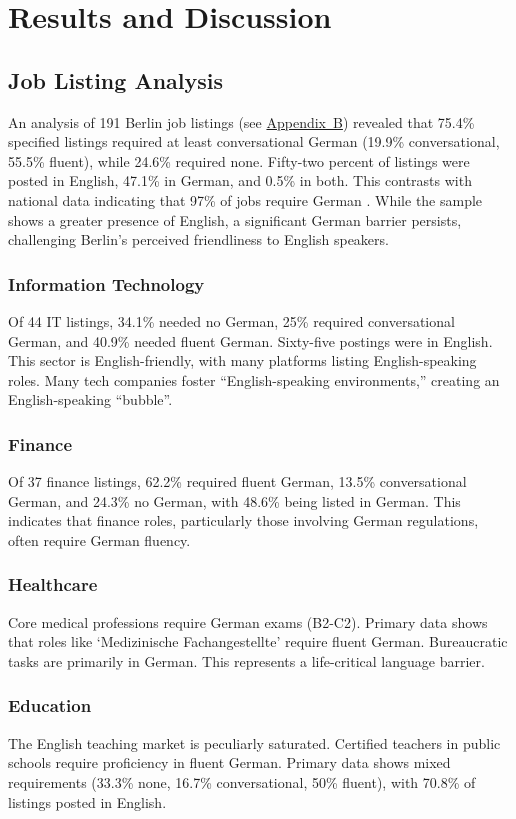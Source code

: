 \chapter{Results and Discussion}
\vspace{5pt}
\section{Job Listing Analysis}
An analysis of 191 Berlin job listings (see \hyperref[appendix:B]{Appendix~B}) revealed that 75.4\% specified listings required at least conversational German (19.9\% conversational, 55.5\% fluent), while 24.6\% required none. Fifty-two percent of listings were posted in English, 47.1\% in German, and 0.5\% in both. This contrasts with national data indicating that 97\% of jobs require German \citep{Jones25}. While the sample shows a greater presence of English, a significant German barrier persists, challenging Berlin’s perceived friendliness to English speakers.

\subsection{Information Technology}
Of 44 IT listings, 34.1\% needed no German, 25\% required conversational German, and 40.9\% needed fluent German. Sixty-five postings were in English. This sector is English-friendly, with many platforms listing English-speaking roles. Many tech companies foster “English-speaking environments,” creating an English-speaking “bubble”.   

\subsection{Finance}
Of 37 finance listings, 62.2\% required fluent German, 13.5\% conversational German, and 24.3\% no German, with 48.6\% being listed in German. This indicates that finance roles, particularly those involving German regulations, often require German fluency.

\subsection{Healthcare}
Core medical professions require German exams (B2-C2). Primary data shows that roles like `Medizinische Fachangestellte' require fluent German. Bureaucratic tasks are primarily in German. This represents a life-critical language barrier. 

\subsection{Education}
The English teaching market is peculiarly saturated. Certified teachers in public schools require proficiency in fluent German. Primary data shows mixed requirements (33.3\% none, 16.7\% conversational, 50\% fluent), with 70.8\% of listings posted in English.

